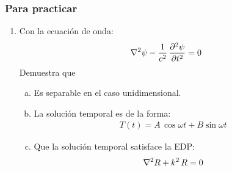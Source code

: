 \documentclass[12pt]{beamer}
\begin{document}
\begin{frame}
\frametitle{Para practicar}
\begin{enumerate}
\conti
\item Con la ecuación de onda:
\begin{align*}
\laplacian{\psi} - \dfrac{1}{c^{2}} \, \pdv[2]{\psi}{t} = 0
\end{align*}
Demuestra que
\begin{enumerate}[a)]
\item Es separable en el caso unidimensional.
\item La solución temporal es de la forma:
\begin{align*}
T (t) = A \, \cos \omega t + B \sin \omega t
\end{align*}
\item Que la solución temporal satisface la EDP:
\begin{align*}
\laplacian{R} + k^{2} \, R = 0
\end{align*}
\end{enumerate}
\end{enumerate}
\end{frame}
\end{document}
